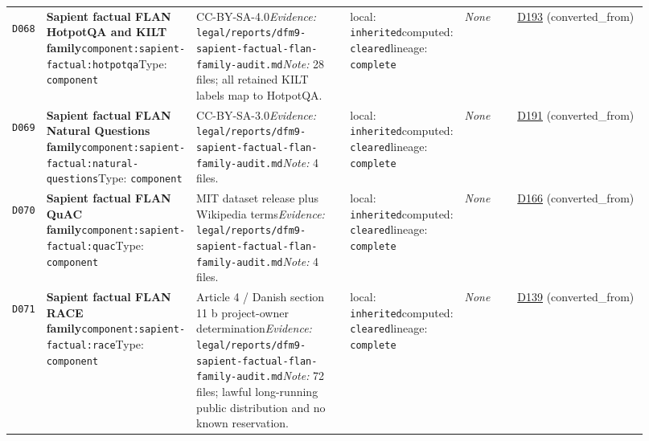 \documentclass[9pt,a4paper]{article}
\newcommand{\depid}[1]{\hypertarget{dep:#1}{\texttt{#1}}}
\begin{document}
\begin{landscape}
\begin{longtable}{@{}L{0.035\linewidth}L{0.185\linewidth}L{0.27\linewidth}L{0.09\linewidth}L{0.10\linewidth}L{0.24\linewidth}@{}}
\depid{D068} & \textbf{Sapient factual FLAN HotpotQA and KILT family}\newline \nolinkurl{component:sapient-factual:hotpotqa}\newline Type: \texttt{component} & CC-BY-SA-4.0\newline \textit{Evidence:} \nolinkurl{legal/reports/dfm9-sapient-factual-flan-family-audit.md}\newline \textit{Note:} 28 files; all retained KILT labels map to HotpotQA. & local: \texttt{inherited}\newline computed: \texttt{cleared}\newline lineage: \texttt{complete} & \textit{None} & \hyperlink{dep:D193}{D193} (converted\_from) \\
\depid{D069} & \textbf{Sapient factual FLAN Natural Questions family}\newline \nolinkurl{component:sapient-factual:natural-questions}\newline Type: \texttt{component} & CC-BY-SA-3.0\newline \textit{Evidence:} \nolinkurl{legal/reports/dfm9-sapient-factual-flan-family-audit.md}\newline \textit{Note:} 4 files. & local: \texttt{inherited}\newline computed: \texttt{cleared}\newline lineage: \texttt{complete} & \textit{None} & \hyperlink{dep:D191}{D191} (converted\_from) \\
\depid{D070} & \textbf{Sapient factual FLAN QuAC family}\newline \nolinkurl{component:sapient-factual:quac}\newline Type: \texttt{component} & MIT dataset release plus Wikipedia terms\newline \textit{Evidence:} \nolinkurl{legal/reports/dfm9-sapient-factual-flan-family-audit.md}\newline \textit{Note:} 4 files. & local: \texttt{inherited}\newline computed: \texttt{cleared}\newline lineage: \texttt{complete} & \textit{None} & \hyperlink{dep:D166}{D166} (converted\_from) \\
\depid{D071} & \textbf{Sapient factual FLAN RACE family}\newline \nolinkurl{component:sapient-factual:race}\newline Type: \texttt{component} & Article 4 / Danish section 11 b project-owner determination\newline \textit{Evidence:} \nolinkurl{legal/reports/dfm9-sapient-factual-flan-family-audit.md}\newline \textit{Note:} 72 files; lawful long-running public distribution and no known reservation. & local: \texttt{inherited}\newline computed: \texttt{cleared}\newline lineage: \texttt{complete} & \textit{None} & \hyperlink{dep:D139}{D139} (converted\_from) \\

\end{longtable}
\end{landscape}
\end{document}
